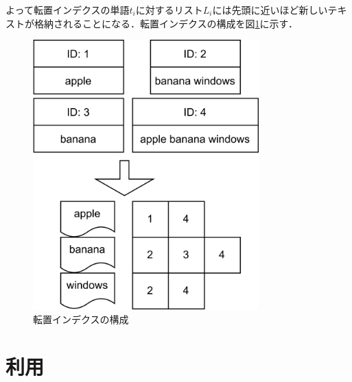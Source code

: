 よって転置インデクスの単語$t_i$に対するリスト$L_i$には先頭に近いほど新しいテキストが格納されることになる．転置インデクスの構成を図\ref{fig:ii}に示す．
\begin{figure}[H]
    \centering
    \includegraphics[width=8.7cm]{img/ii.png}
    \caption{転置インデクスの構成}
    \label{fig:ii}
\end{figure}

\section{利用}

